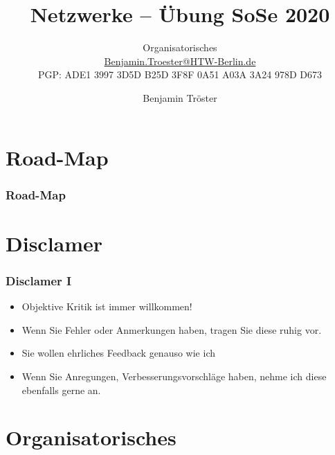 \documentclass[xcolor=dvipsnames,aspectratio=169]{beamer}
\begin{document}

\title{Netzwerke -- Übung SoSe 2020}
\subtitle{Organisatorisches\\

\href{mailto:Benjamin.Troester@HTW-Berlin.de}{Benjamin.Troester@HTW-Berlin.de}\\
		PGP: ADE1 3997 3D5D B25D 3F8F 0A51 A03A 3A24 978D D673 }

\author{Benjamin Tröster}

\date{}

\begin{frame}
\titlepage
\end{frame}

\section*{Road-Map}
\begin{frame}
\frametitle{Road-Map}
\begin{multicols}{2}
  \tableofcontents
\end{multicols}
\end{frame}

\section{Disclamer}
\begin{frame}
	\frametitle{Disclamer I}
	\begin{itemize}
		\item Objektive Kritik ist immer willkommen!
		\item Wenn Sie Fehler oder Anmerkungen haben, tragen Sie diese ruhig vor.
		\item Sie wollen ehrliches Feedback genauso wie ich
		\item Wenn Sie Anregungen, Verbesserungsvorschläge haben, nehme ich diese ebenfalls gerne an.
	\end{itemize}
\end{frame}

\section{Organisatorisches}
\end{document}
